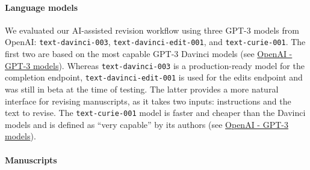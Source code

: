 \documentclass[
]{article}
\begin{document}
\hypertarget{language-models}{%
\paragraph{Language models}\label{language-models}}

We evaluated our AI-assisted revision workflow using three GPT-3 models from OpenAI: \texttt{text-davinci-003}, \texttt{text-davinci-edit-001}, and \texttt{text-curie-001}.
The first two are based on the most capable GPT-3 Davinci models (see \href{https://platform.openai.com/docs/models/gpt-3}{OpenAI - GPT-3 models}).
Whereas \texttt{text-davinci-003} is a production-ready model for the completion endpoint, \texttt{text-davinci-edit-001} is used for the edits endpoint and was still in beta at the time of testing.
The latter provides a more natural interface for revising manuscripts, as it takes two inputs: instructions and the text to revise.
The \texttt{text-curie-001} model is faster and cheaper than the Davinci models and is defined as ``very capable'' by its authors (see \href{https://platform.openai.com/docs/models/gpt-3}{OpenAI - GPT-3 models}).

\hypertarget{manuscripts}{%
\paragraph{Manuscripts}\label{manuscripts}}
\end{document}
